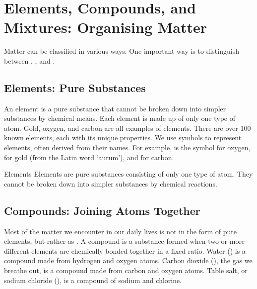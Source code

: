 \section{Elements, Compounds, and Mixtures: Organising Matter}


Matter can be classified in various ways. One important way is to distinguish between , , and .

\subsection{Elements: Pure Substances}


An element is a pure substance that cannot be broken down into simpler substances by chemical means.  Each element is made up of only one type of atom.  Gold, oxygen, and carbon are all examples of elements.  There are over 100 known elements, each with its unique properties.  We use symbols to represent elements, often derived from their names. For example,  is the symbol for oxygen,  for gold (from the Latin word ‘aurum’), and  for carbon.

\begin{keyconcept}{Elements}
Elements are pure substances consisting of only one type of atom. They cannot be broken down into simpler substances by chemical reactions.
\end{keyconcept}

\subsection{Compounds: Joining Atoms Together}


Most of the matter we encounter in our daily lives is not in the form of pure elements, but rather as .  A compound is a substance formed when two or more different elements are chemically bonded together in a fixed ratio.  Water () is a compound made from hydrogen and oxygen atoms. Carbon dioxide (), the gas we breathe out, is a compound made from carbon and oxygen atoms. Table salt, or sodium chloride (), is a compound of sodium and chlorine.

